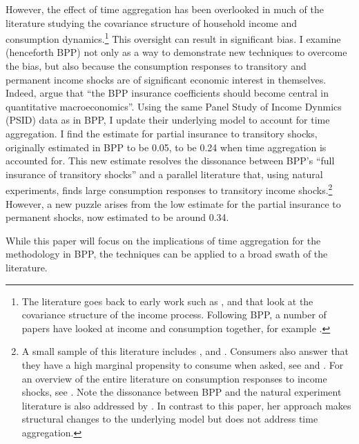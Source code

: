 \documentclass[AER]{AEA}
\begin{document}
However, the effect of time aggregation has been overlooked in much of the  literature studying the covariance structure of household income and consumption dynamics.\footnote{The literature goes back to early work such as \cite{hause_1973}, \cite{weiss_1979} and  \cite{macurdy_time_1982} that look at the covariance structure of the income process. Following BPP, a number of papers have looked at income and consumption together, for example \cite{arellano_earnings_2017} .} This oversight can result in significant bias. I examine \cite{blundell_consumption_2008} (henceforth BPP) not only as a way to demonstrate new techniques to overcome the bias, but also because the consumption responses to transitory and permanent income shocks are of significant economic interest in themselves. Indeed, \cite{kaplan_how_2010} argue that ``the BPP insurance coefficients should become central in quantitative macroeconomics''. Using the same Panel Study of Income Dynmics (PSID) data as in BPP, I update their underlying model to account for time aggregation. I find the estimate for partial insurance to transitory shocks, originally estimated in BPP to be 0.05, to be 0.24 when time aggregation is accounted for. This new estimate resolves the dissonance between BPP's ``full insurance of transitory shocks'' and  a parallel literature that, using natural experiments, finds large consumption responses to transitory income shocks.\footnote{A small sample of this literature includes \cite{parker_consumer_2013}, \cite{agarwal_consumption_2014} and \cite{Sahmetal:2008TaxRebates}. Consumers also answer that they have a high marginal propensity to consume when asked, see \cite{fuster_what_2018} and \cite{jappelli_fiscal_2014}. For an overview of the entire literature on consumption responses to income shocks, see \cite{jappelli_consumption_2010}. Note the dissonance between BPP and the natural experiment literature is also addressed by \cite{commault_how_2017}. In contrast to this paper, her approach makes structural changes to the underlying model but does not address time aggregation.} However, a new puzzle arises from the low estimate for the partial insurance to permanent shocks, now estimated to be around 0.34. 

 While this paper will focus on the implications of time aggregation for the methodology in BPP, the techniques can be applied to a broad swath of the literature.
\end{document}
